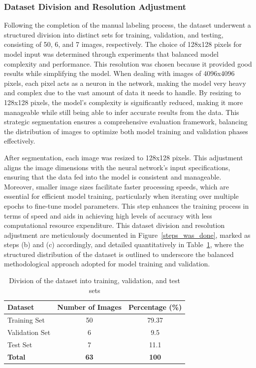 \documentclass[preprint,12pt]{elsarticle}
\begin{document}
\subsubsection{Dataset Division and Resolution Adjustment}
Following the completion of the manual labeling process, the dataset underwent a structured division into distinct sets for training, validation, and testing, consisting of 50, 6, and 7 images, respectively. The choice of 128x128 pixels for model input was determined through experiments that balanced model complexity and performance. This resolution was chosen because it provided good results while simplifying the model. When dealing with images of 4096x4096 pixels, each pixel acts as a neuron in the network, making the model very heavy and complex due to the vast amount of data it needs to handle. By resizing to 128x128 pixels, the model's complexity is significantly reduced, making it more manageable while still being able to infer accurate results from the data. This strategic segmentation ensures a comprehensive evaluation framework, balancing the distribution of images to optimize both model training and validation phases effectively.

After segmentation, each image was resized to 128x128 pixels. This adjustment aligns the image dimensions with the neural network's input specifications, ensuring that the data fed into the model is consistent and manageable. Moreover, smaller image sizes facilitate faster processing speeds, which are essential for efficient model training, particularly when iterating over multiple epochs to fine-tune model parameters. This step enhances the training process in terms of speed and aids in achieving high levels of accuracy with less computational resource expenditure. This dataset division and resolution adjustment are meticulously documented in Figure~\ref{steps_was_done}, marked as steps (b) and (c) accordingly, and detailed quantitatively in Table~\ref{tab:dataset_division}, where the structured distribution of the dataset is outlined to underscore the balanced methodological approach adopted for model training and validation.

\begin{table}[htbp]
\centering
\small
\caption{Division of the dataset into training, validation, and test sets}
\label{tab:dataset_division}
\begin{tabular}{@{}lcc@{}}
\toprule
\textbf{Dataset} & \textbf{Number of Images} & \textbf{Percentage (\%)} \\ \midrule
Training Set & 50 & 79.37 \\
Validation Set & 6 & 9.5 \\ \bottomrule
Test Set & 7 & 11.1 \\ \bottomrule
\textbf{Total} & \textbf{63} & \textbf{100} \\ \bottomrule
\end{tabular}
\end{table}
\end{document}
